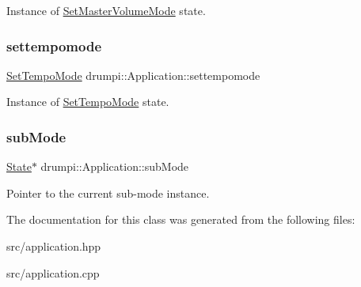 Instance of \hyperlink{classdrumpi_1_1SetMasterVolumeMode}{Set\+Master\+Volume\+Mode} state. \mbox{\label{classdrumpi_1_1Application_a2316f62710a89af187fe7bec9fcac5e8}} 
\subsubsection{\texorpdfstring{settempomode}{settempomode}}
{\footnotesize\ttfamily \hyperlink{classdrumpi_1_1SetTempoMode}{Set\+Tempo\+Mode} drumpi\+::\+Application\+::settempomode}

Instance of \hyperlink{classdrumpi_1_1SetTempoMode}{Set\+Tempo\+Mode} state. \mbox{\label{classdrumpi_1_1Application_a8af8346be9bf3ff5b3307336d0a9a406}} 
\subsubsection{\texorpdfstring{sub\+Mode}{subMode}}
{\footnotesize\ttfamily \hyperlink{classdrumpi_1_1State}{State}$\ast$ drumpi\+::\+Application\+::sub\+Mode}

Pointer to the current sub-\/mode instance. 

The documentation for this class was generated from the following files\+:\begin{DoxyCompactItemize}
\item 
src/application.\+hpp\item 
src/application.\+cpp\end{DoxyCompactItemize}

